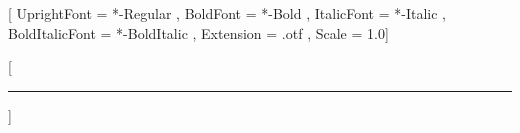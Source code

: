 \usepackage{unicode-math}


\setmainfont{STIXTwoText}[
    UprightFont = *-Regular ,
    BoldFont = *-Bold ,
    ItalicFont = *-Italic ,
    BoldItalicFont = *-BoldItalic ,
    Extension = .otf ,
    Scale = 1.0]

\usepackage{minted}
\usepackage[color=black]{siunitx}
\usepackage[ISO]{diffcoeff}
\usepackage{tikz}
\usepackage{tkz-euclide}
\usepackage{tkz-graph}
\usepackage{dashrule}
\usepackage{float}
\usepackage{fontawesome}



[\vspace{-1em}\color{structurecolor}\rule{\textwidth}{2pt}\vspace*{\fill}\newpage]

